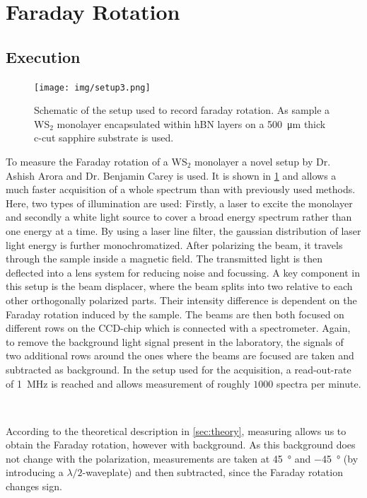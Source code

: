 \newpage
\section{Faraday Rotation}

\subsection{Execution}

\begin{figure}[!ht]
    \centering
    \texttt{[image: img/setup3.png]}
    \caption{Schematic of the setup used to record faraday rotation. As sample a WS$_2$ monolayer encapsulated within hBN layers on a \SI{500}{\micro\meter} thick c-cut sapphire substrate is used.}
    \label{fig_setup3}
\end{figure}
To measure the Faraday rotation of a WS$_2$ monolayer a novel setup by Dr. Ashish Arora and Dr. Benjamin Carey is used.
It is shown in \cref{fig_setup3} and allows a much faster acquisition of a whole spectrum than with previously used methods.
Here, two types of illumination are used:
Firstly, a laser to excite the monolayer and secondly a white light source to cover a broad energy spectrum rather than one energy at a time.
By using a laser line filter, the gaussian distribution of laser light energy is further monochromatized.
After polarizing the beam, it travels through the sample inside a magnetic field.
The transmitted light is then deflected into a lens system for reducing noise and focussing.
A key component in this setup is the beam displacer, where the beam splits into two relative to each other orthogonally polarized parts.
Their intensity difference is dependent on the Faraday rotation induced by the sample.
The beams are then both focused on different rows on the CCD-chip which is connected with a spectrometer.
Again, to remove the background light signal present in the laboratory, the signals of two additional rows around the ones where the beams are focused are taken and subtracted as background.
In the setup used for the acquisition, a read-out-rate of \SI{1}{\mega\hertz} is reached and allows measurement of roughly $1000$ spectra per minute.

\

According to the theoretical description in \cref{sec:theory}, measuring allows us to obtain the Faraday rotation, however with background.
As this background does not change with the polarization, measurements are taken at \SI{+45}{\degree} and \SI{-45}{\degree} (by introducing a $\lambda/2$-waveplate) and then subtracted, since the Faraday rotation changes sign.

